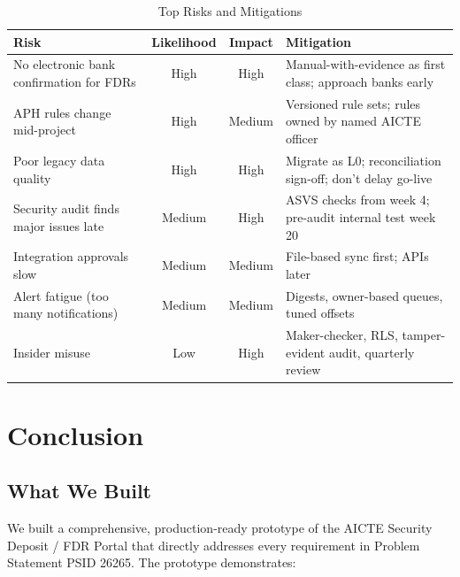 \documentclass[12pt, a4paper]{report}
\begin{document}
\begin{table}[H]
\centering
\caption{Top Risks and Mitigations}
\begin{tabularx}{\textwidth}{|X|c|c|X|}
\hline
\textbf{Risk} & \textbf{Likelihood} & \textbf{Impact} & \textbf{Mitigation} \\
\hline
No electronic bank confirmation for FDRs & High & High & Manual-with-evidence as first class; approach banks early \\
\hline
APH rules change mid-project & High & Medium & Versioned rule sets; rules owned by named AICTE officer \\
\hline
Poor legacy data quality & High & High & Migrate as L0; reconciliation sign-off; don't delay go-live \\
\hline
Security audit finds major issues late & Medium & High & ASVS checks from week 4; pre-audit internal test week 20 \\
\hline
Integration approvals slow & Medium & Medium & File-based sync first; APIs later \\
\hline
Alert fatigue (too many notifications) & Medium & Medium & Digests, owner-based queues, tuned offsets \\
\hline
Insider misuse & Low & High & Maker-checker, RLS, tamper-evident audit, quarterly review \\
\hline
\end{tabularx}
\end{table}


\chapter{Conclusion}

\section{What We Built}

We built a comprehensive, production-ready prototype of the AICTE Security Deposit / FDR Portal that directly addresses every requirement in Problem Statement PSID 26265. The prototype demonstrates:
\end{document}
